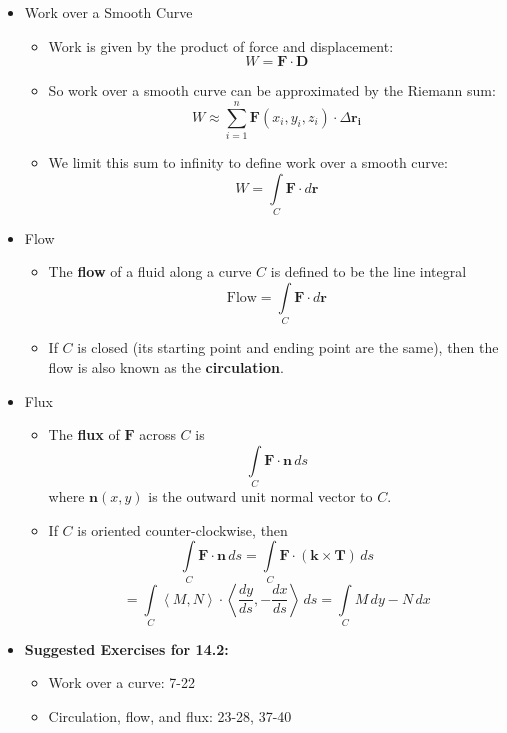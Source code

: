 \documentclass[12pt]{article}
\renewcommand{\vec}[1]{\mathbf{#1}}
\newcommand{\veck}{\mathbf{k}}
\newcommand{\dvar}[1]{\,d{#1}}
\newcommand{\<}{\left<}
\renewcommand{\>}{\right>}
\begin{document}
\begin{itemize}
  \item Work over a Smooth Curve
  
    \begin{itemize}
    \item Work is given by the product of force and displacement: \[W = \vec{F} \cdot \vec{D}\]
    \item So work over a smooth curve can be approximated by the Riemann sum: \[W \approx \sum_{i=1}^n \vec{F}(x_i,y_i,z_i)\cdot\Delta\vec{r_i}\]
    \item We limit this sum to infinity to define work over a smooth curve: \[W = \int\limits_C \vec{F}\cdot d\vec{r}\]
    \end{itemize}
    
  \item Flow
  
    \begin{itemize}
    \item The \textbf{flow} of a fluid along a curve $C$ is defined to be the line integral \[\textrm{Flow} = \int\limits_C \vec{F}\cdot d\vec{r} \]
    \item If $C$ is closed (its starting point and ending point are the same), then the flow is also known as the \textbf{circulation}.
    \end{itemize}
    
  \newpage
    
  \item Flux
  
    \begin{itemize}
    \item The \textbf{flux} of $\vec{F}$ across $C$ is \[\int\limits_C \vec{F}\cdot\vec{n}\,ds\] where $\vec{n}(x,y)$ is the outward unit normal vector to $C$.
    \item If $C$ is oriented counter-clockwise, then \[\int\limits_C \vec{F}\cdot\vec{n}\dvar{s} = \int\limits_C \vec{F}\cdot(\veck\times\vec{T})\dvar{s} \]\[= \int\limits_C \<M,N\>\cdot\<\frac{dy}{ds},-\frac{dx}{ds}\>\dvar{s} = \int\limits_C M\dvar{y} - N\dvar{x}\]
    \end{itemize}
        
  \item \textbf{Suggested Exercises for 14.2:}
  
    \begin{itemize}
    \item Work over a curve: 7-22
    \item Circulation, flow, and flux: 23-28, 37-40
    \end{itemize}
    
  \end{itemize}
  
\end{document}
